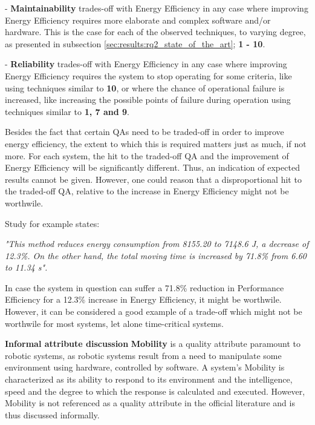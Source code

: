 - \textbf{Maintainability} trades-off with Energy Efficiency in any case where improving Energy Efficiency requires more elaborate and complex software and/or hardware. 
This is the case for each of the observed techniques, to varying degree, as presented in subsection \ref{sec:results:rq2_state_of_the_art}; \textbf{1 - 10}.

\vspace{1mm}

- \textbf{Reliability} trades-off with Energy Efficiency in any case where improving Energy Efficiency requires the system to 
stop operating for some criteria, like using techniques similar to \textbf{10}, or where the chance of operational failure is increased, 
like increasing the possible points of failure during operation using techniques similar to \textbf{1, 7 and 9}. 

Besides the fact that certain QAs need to be traded-off in order to improve energy efficiency, the extent to which this is required 
matters just as much, if not more.
For each system, the hit to the traded-off QA and the improvement of Energy Efficiency will be significantly different.
Thus, an indication of expected results cannot be given.
However, one could reason that a disproportional hit to the traded-off QA, relative to the increase in Energy Efficiency might not be worthwile.

Study \cite{kaitwanidvilai2020industrial_robot_cycle_time} for example states: 

\noindent\textit{"This method reduces energy consumption from 8155.20 to 7148.6 J, 
a decrease of 12.3\%. On the other hand, the total moving time is increased by 71.8\% from 6.60 to 11.34 s".}

In case the system in question can suffer a 71.8\% reduction in Performance Efficiency for a 12.3\% increase in Energy Efficiency, it might be worthwile.
However, it can be considered a good example of a trade-off which might not be worthwile for most systems, let alone time-critical systems.

\vspace{1mm}

\noindent \textbf{Informal attribute discussion}
\newline
\textbf{Mobility} is a quality attribute paramount to robotic systems, 
as robotic systems result from a need to manipulate some environment using hardware, controlled by software.
A system's Mobility is characterized as its ability to respond to its environment and 
the intelligence, speed and the degree to which the response is calculated and executed.
However, Mobility is not referenced as a quality attribute in the official literature and is thus discussed informally.

